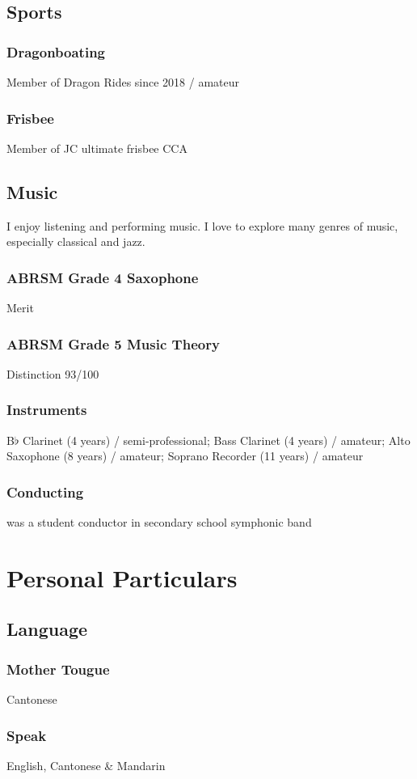 \documentclass[a4paper]{article}
\begin{document}
\subsection{Sports}
\subsubsection{Dragonboating}
Member of Dragon Rides since 2018 / amateur
\subsubsection{Frisbee}
Member of JC ultimate frisbee CCA
\subsection{Music}
I enjoy listening and performing music. I love to explore many genres of music, especially classical and jazz.
\subsubsection{ABRSM Grade 4 Saxophone}
Merit
\subsubsection{ABRSM Grade 5 Music Theory}
Distinction 93/100
\subsubsection{Instruments}
B$\flat$ Clarinet (4 years) / semi-professional; Bass Clarinet (4 years) / amateur; Alto Saxophone (8 years) / amateur; Soprano Recorder (11 years) / amateur
\subsubsection{Conducting}
was a student conductor in secondary school symphonic band

\section{Personal Particulars}
\subsection{Language}
\subsubsection{Mother Tougue}
Cantonese
\subsubsection{Speak}
English, Cantonese \& Mandarin
\end{document}
